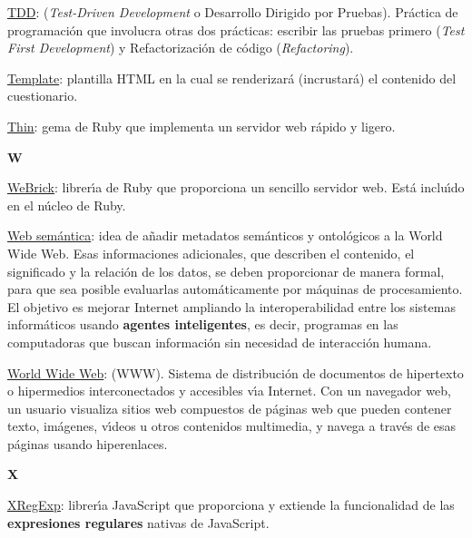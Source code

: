 \underline{TDD}: (\textit{Test-Driven Development} o Desarrollo Dirigido por Pruebas). Pr\'actica de programaci\'on que involucra otras dos pr\'acticas: escribir las pruebas primero (\textit{Test 
First Development}) y Refactorizaci\'on de c\'odigo (\textit{Refactoring}).
\bigskip

\underline{Template}: plantilla HTML en la cual se renderizar\'a (incrustar\'a) el contenido del cuestionario.
\bigskip

\href{https://rubygems.org/gems/thin}{\underline{Thin}}: gema de Ruby que implementa un servidor web r\'apido y ligero.
\bigskip

\bigskip
{\bfseries {\Huge W}}\label{Apendice1:W}
\bigskip
\bigskip

\underline{WeBrick}: librer\'{\i}a de Ruby que proporciona un sencillo servidor web. Est\'a inclu\'{\i}do en el n\'ucleo de Ruby. 
\bigskip

\underline{Web sem\'antica}: idea de a\~{n}adir metadatos sem\'anticos y ontol\'ogicos a la World Wide Web. Esas informaciones adicionales, que describen el contenido, el significado y la relaci\'on 
de los datos, se deben proporcionar de manera formal, para que sea posible evaluarlas autom\'aticamente por m\'aquinas de procesamiento. El objetivo es mejorar Internet ampliando la 
interoperabilidad entre los sistemas inform\'aticos usando {\bfseries agentes inteligentes}, es decir, programas en las computadoras que buscan informaci\'on sin necesidad de interacci\'on humana.
\bigskip

\underline{World Wide Web}: (WWW). Sistema de distribuci\'on de documentos de hipertexto o hipermedios interconectados y accesibles v\'{\i}a Internet. Con un navegador web, un usuario visualiza 
sitios web compuestos de p\'aginas web que pueden contener texto, im\'agenes, v\'{\i}deos u otros contenidos multimedia, y navega a trav\'es de esas p\'aginas usando hiperenlaces.
\bigskip

\bigskip
{\bfseries {\Huge X}}\label{Apendice1:X}
\bigskip
\bigskip

\href{http://xregexp.com/}{\underline{XRegExp}}: librer\'{\i}a JavaScript que proporciona y extiende la funcionalidad de las {\bfseries expresiones regulares} nativas de JavaScript.
\bigskip
